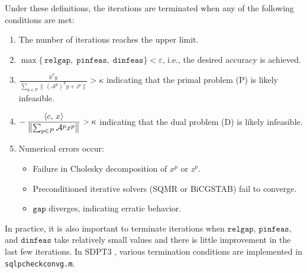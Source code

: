 Under these definitions, the iterations are terminated when any of the following conditions are met:
\begin{enumerate}
    \item The number of iterations reaches the upper limit.
    \item 
      $\displaystyle
      \max\{\,\mathtt{relgap},\;\mathtt{pinfeas},\;\mathtt{dinfeas}\}
      < \varepsilon
      $, i.e., the desired accuracy is achieved.
    \item 
      $\displaystyle
        \frac{\,b^T y\,}
              {\,\sum_{p\in P}\|\,(\mathcal{A}^p)^T y + z^p\|\!}
      > \kappa
      $
      indicating that the primal problem (P) is likely infeasible.
    \item 
      $\displaystyle
      -\,\frac{\left\langle c, \, x \right\rangle}
              {\bigl\|\sum_{p\in P}\mathcal{A}^p x^p\bigr\|}
      > \kappa
      $
      indicating that the dual problem (D) is likely infeasible.
    \item Numerical errors occur:
      \begin{itemize}
          \item Failure in Cholesky decomposition of $x^p$ or $z^p$.
          \item Preconditioned iterative solvers (SQMR or BiCGSTAB) fail to converge.
          \item $\mathtt{gap}$ diverges, indicating erratic behavior.
      \end{itemize}
\end{enumerate}
In practice, it is also important to terminate iterations when $\mathtt{relgap}$, $\mathtt{pinfeas}$, and $\mathtt{dinfeas}$ take relatively small values and there is little improvement in the last few iterations.
In SDPT3 \cite{toh1999}, various termination conditions are implemented in \texttt{sqlpcheckconvg.m}.

